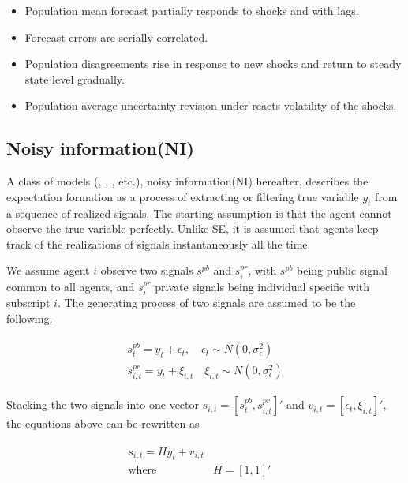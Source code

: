 \documentclass[]{article}
\begin{document}
	\begin{itemize}
		\item Population mean forecast partially responds to shocks and with lags. 
		\item Forecast errors are serially correlated. 
		\item Population disagreements rise in response to new shocks and return to steady state level gradually. 
		\item Population average uncertainty revision under-reacts volatility of the shocks.
	\end{itemize}
	
	\subsection{Noisy information(NI)}
	
	A class of models (\citet{lucas1972expectations}, \citet{sims2003implications}, \cite{woodford2001imperfect}, etc.), noisy information(NI) hereafter, describes the expectation formation as a process of extracting or filtering true variable $y_t$ from a sequence of realized signals.  The starting assumption is that the agent cannot observe the true variable perfectly. Unlike SE, it is assumed that agents keep track of the realizations of signals instantaneously all the time. 
	
	We assume agent $i$ observe two signals $s^{pb}$ and $s^{pr}_i$, with $s^{pb}$ being public signal common to all agents, and $s^{pr}_i$ private signals being individual specific with subscript $i$. The generating process of two signals are assumed to be the following.
	
	\begin{eqnarray}\label{NISigDef}
		\begin{aligned}
			s^{pb}_t = y_t + \epsilon_t, \quad \epsilon_t \sim N(0,\sigma^2_\epsilon)\\ 
			s^{pr}_{i,t} = y_t + \xi_{i,t} \quad \xi_{i,t} \sim N(0,\sigma^2_\epsilon)
		\end{aligned}
	\end{eqnarray}
	
	Stacking the two signals into one vector $s_{i,t} = [s^{pb}_t,s^{pr}_{i,t}]'$ and $v_{i,t}= [\epsilon_t,\xi_{i,t}]'$, the equations above can be rewritten as 
	
	\begin{eqnarray}
		\begin{aligned}
			s_{i,t} = H y_{t} + v_{i,t} \\
			\text{where } & H=[1,1]' \quad \\
		\end{aligned}
	\end{eqnarray}
	
\end{document}
